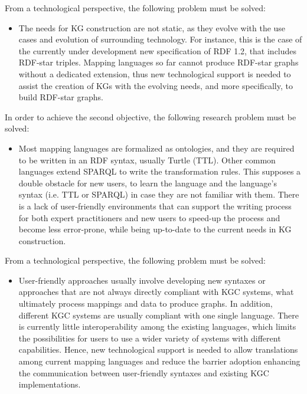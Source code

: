 From a technological perspective, the following problem must be solved:
\begin{itemize}
    \item The needs for KG construction are not static, as they evolve with the use cases and evolution of surrounding technology. For instance, this is the case of the currently under development new specification of RDF 1.2, that includes RDF-star triples. Mapping languages so far cannot produce RDF-star graphs without a dedicated extension, thus new technological support is needed to assist the creation of KGs with the evolving needs, and more specifically, to build RDF-star graphs. 
\end{itemize}

In order to achieve the second objective, the following research problem must be solved:
\begin{itemize}
    \item Most mapping languages are formalized as ontologies, and they are required to be written in an RDF syntax, usually Turtle (TTL). Other common languages extend SPARQL to write the transformation rules. This supposes a double obstacle for new users, to learn the language and the language's syntax (i.e. TTL or SPARQL) in case they are not familiar with them. There is a lack of user-friendly environments that can support the writing process for both expert practitioners and new users to speed-up the process and become less error-prone, while being up-to-date to the current needs in KG construction.
\end{itemize}

From a technological perspective, the following problem must be solved:
\begin{itemize}

    \item User-friendly approaches usually involve developing new syntaxes or approaches that are not always directly compliant with KGC systems, what ultimately process mappings and data to produce graphs. In addition, different KGC systems are usually compliant with one single language. There is currently little interoperability among the existing languages, which limits the possibilities for users to use a wider variety of systems with different capabilities. Hence, new technological support is needed to allow translations among current mapping languages and reduce the barrier adoption enhancing the communication between user-friendly syntaxes and existing KGC implementations.   

\end{itemize}


